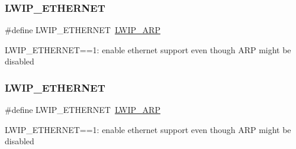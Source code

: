 \subsubsection{\texorpdfstring{L\+W\+I\+P\+\_\+\+E\+T\+H\+E\+R\+N\+ET}{LWIP\_ETHERNET}\hspace{0.1cm}{\footnotesize\ttfamily [1/2]}}
{\footnotesize\ttfamily \#define L\+W\+I\+P\+\_\+\+E\+T\+H\+E\+R\+N\+ET~\hyperlink{group__lwip__opts__arp_ga9609a014bba4638cc191d6a8f9556c87}{L\+W\+I\+P\+\_\+\+A\+RP}}

L\+W\+I\+P\+\_\+\+E\+T\+H\+E\+R\+N\+ET==1\+: enable ethernet support even though A\+RP might be disabled \mbox{\label{group__lwip__opts__arp_ga30e02dc217cc2995d0fd241d510c904f}} 
\subsubsection{\texorpdfstring{L\+W\+I\+P\+\_\+\+E\+T\+H\+E\+R\+N\+ET}{LWIP\_ETHERNET}\hspace{0.1cm}{\footnotesize\ttfamily [2/2]}}
{\footnotesize\ttfamily \#define L\+W\+I\+P\+\_\+\+E\+T\+H\+E\+R\+N\+ET~\hyperlink{group__lwip__opts__arp_ga9609a014bba4638cc191d6a8f9556c87}{L\+W\+I\+P\+\_\+\+A\+RP}}

L\+W\+I\+P\+\_\+\+E\+T\+H\+E\+R\+N\+ET==1\+: enable ethernet support even though A\+RP might be disabled 